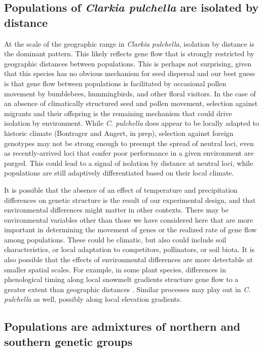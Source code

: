 \documentclass{article}
\begin{document}
\subsection*{Populations of \textit{Clarkia pulchella} are isolated by distance}

At the scale of the geographic range in \textit{Clarkia pulchella}, isolation by distance is the dominant pattern. This likely reflects gene flow that is strongly restricted by geographic distances between populations. This is perhaps not surprising, given that this species has no obvious mechanism for seed dispersal and our best guess is that gene flow between populations is facilitated by occasional pollen movement by bumblebees, hummingbirds, and other floral visitors. In the case of an absence of climatically structured seed and pollen movement, selection against migrants and their offspring is the remaining mechanism that could drive isolation by environment. While \textit{C. pulchella} does appear to be locally adapted to historic climate (Bontrager and Angert, in prep), selection against foreign genotypes may not be strong enough to preempt the spread of neutral loci, even as recently-arrived loci that confer poor performance in a given environment are purged. This could lead to a signal of isolation by distance at neutral loci, while populations are still adaptively differentiated based on their local climate.

It is possible that the absence of an effect of temperature and precipitation differences on genetic structure is the result of our experimental design, and that environmental differences might matter in other contexts. There may be environmental variables other than those we have considered here that are more important in determining the movement of genes or the realized rate of gene flow among populations. These could be climatic, but also could include soil characteristics, or local adaptation to competitors, pollinators, or soil biota. It is also possible that the effects of environmental differences are more detectable at smaller spatial scales. For example, in some plant species, differences in phenological timing along local snowmelt gradients structure gene flow to a greater extent than geographic distances \citep{hirao2004landscape, shimono2009morphological}. Similar processes may play out in \textit{C. pulchella} as well, possibly along local elevation gradients.

\subsection*{Populations are admixtures of northern and southern genetic groups}
\end{document}
